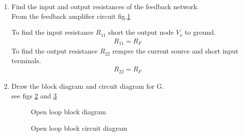 \begin{enumerate}[label=\arabic*.,ref=\theenumi]
%
%
\begin{figure}[ht!]
	\begin{center}
		\resizebox{\columnwidth}{!}{}
	\end{center}
	\caption{Feedback circuit}
	\label{fig:ee18btech11046_fc}
\end{figure}
\renewcommand{\thefigure}{\theenumi}
%

From KVl on \ref{fig:ee18btech11046_fc} we can see that
\begin{align}
H=\frac{I_{F}}{V_{o}} = -\frac{1}{R_{F}}
\end{align}

\item Find the input and output resistances of the feedback network.\\
\solution
From the feedback amplifier circuit fig.\ref{fig:ee18btech11046_fc}

To find the input resistance $R_{11}$ short
the output node $V_{o}$ to ground.
\begin{align}
R_{11} = R_{F}
\end{align}
To find the output resistance $R_{22}$ rempve the current source and short input terminals.
\begin{align}
R_{22} = R_{F}
\end{align}

\item Draw the block diagram and circuit diagram for G.
\\
\solution see figs \ref{fig:ee18btech11046_Gblock} and \ref{fig:ee18btech11046_Gcir}
%
\renewcommand{\thefigure}{\theenumi.\arabic{figure}}

\begin{figure}[ht!]
	\begin{center}
		\resizebox{\columnwidth}{!}{}
	\end{center}
	\caption{Open loop block diagram}
	\label{fig:ee18btech11046_Gblock}
\end{figure}

%
\begin{figure}[ht!]
	\begin{center}
		\resizebox{\columnwidth}{!}{}
	\end{center}
	\caption{Open loop block circuit diagram}
	\label{fig:ee18btech11046_Gcir}
\end{figure}


\end{enumerate}
